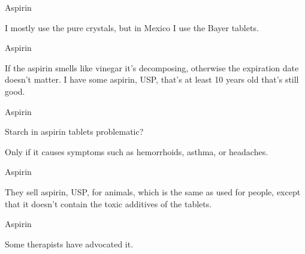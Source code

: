 \documentclass[11pt,oneside,openany,extrafontsizes]{memoir}
\begin{document}
\begin{standalonequote}{Aspirin}

    \begin{answer}
        I mostly use the pure crystals, but in Mexico I use the Bayer tablets.
    \end{answer}
\end{standalonequote}

\begin{standalonequote}{Aspirin}

    \begin{answer}
        If the aspirin smells like vinegar it's decomposing, otherwise the expiration date doesn't matter. I have some aspirin, USP, that's at least 10 years old that's still good.
    \end{answer}
\end{standalonequote}

\begin{qaexchange}{Aspirin}

    \begin{question}
        Starch in aspirin tablets problematic?
    \end{question}

    \begin{answer}
        Only if it causes symptoms such as hemorrhoids, asthma, or headaches.
    \end{answer}
\end{qaexchange}

\begin{standalonequote}{Aspirin}

    \begin{answer}
        They sell aspirin, USP, for animals, which is the same as used for people, except that it doesn't contain the toxic additives of the tablets.
    \end{answer}
\end{standalonequote}

\begin{standalonequote}{Aspirin}

    \begin{answer}
        Some therapists have advocated it.
    \end{answer}
\end{standalonequote}
\end{document}
